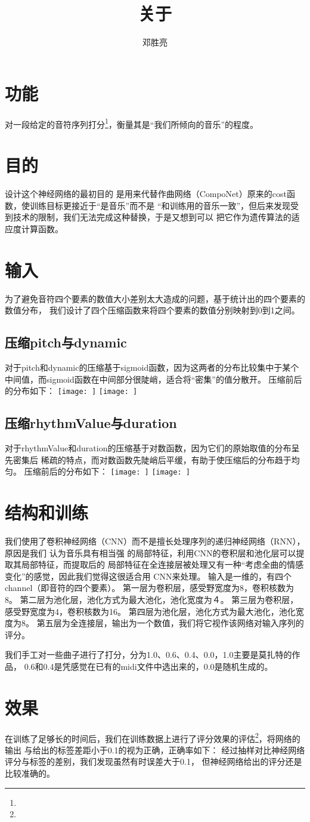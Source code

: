 \documentclass[UTF8]{article}
\title{关于}
\author{邓胜亮}
\begin{document}
  \maketitle
  \section{功能}
    对一段给定的音符序列打分\footnote{}，衡量其是“我们所倾向的音乐”的程度。
  \section{目的}
    设计这个神经网络的最初目的
    是用来代替作曲网络（CompoNet）原来的cost函数，使训练目标更接近于“是音乐”而不是
    “和训练用的音乐一致”，但后来发现受到技术的限制，我们无法完成这种替换，于是又想到可以
    把它作为遗传算法的适应度计算函数。
  \section{输入}
    为了避免音符四个要素的数值大小差别太大造成的问题，基于统计出的四个要素的数值分布，
    我们设计了四个压缩函数来将四个要素的数值分别映射到0到1之间。
    \subsection{压缩pitch与dynamic}
      对于pitch和dynamic的压缩基于sigmoid函数，因为这两者的分布比较集中于某个
      中间值，而sigmoid函数在中间部分很陡峭，适合将“密集”的值分散开。
      压缩前后的分布如下：
      \texttt{[image: ]}
      \texttt{[image: ]}
    \subsection{压缩rhythmValue与duration}
      对于rhythmValue和duration的压缩基于对数函数，因为它们的原始取值的分布呈先密集后
      稀疏的特点，而对数函数先陡峭后平缓，有助于使压缩后的分布趋于均匀。
      压缩前后的分布如下：
      \texttt{[image: ]}
      \texttt{[image: ]}

  \section{结构和训练}
    我们使用了卷积神经网络（CNN）而不是擅长处理序列的递归神经网络（RNN），原因是我们
    认为音乐具有相当强
    的局部特征，利用CNN的卷积层和池化层可以提取其局部特征\cite{}，而提取后的
    局部特征在全连接层被处理又有一种“考虑全曲的情感变化”的感觉，因此我们觉得这很适合用
    CNN来处理。
    输入是一维的，有四个channel（即音符的四个要素）。
    第一层为卷积层，感受野宽度为8，卷积核数为8。
    第二层为池化层，池化方式为最大池化，池化宽度为４。
    第三层为卷积层，感受野宽度为4，卷积核数为16。
    第四层为池化层，池化方式为最大池化，池化宽度为8。
    第五层为全连接层，输出为一个数值，我们将它视作该网络对输入序列的评分。

    我们手工对一些曲子进行了打分，分为1.0、0.6、0.4、0.0，1.0主要是莫扎特的作品，
    0.6和0.4是凭感觉在已有的midi文件中选出来的，0.0是随机生成的。
  \section{效果}
    在训练了足够长的时间后，我们在训练数据上进行了评分效果的评估\footnote{}，将网络的输出
    与给出的标签差距小于0.1的视为正确，正确率如下：
    经过抽样对比神经网络评分与标签的差别，我们发现虽然有时误差大于0.1，
    但神经网络给出的评分还是比较准确的。 %
\end{document}
